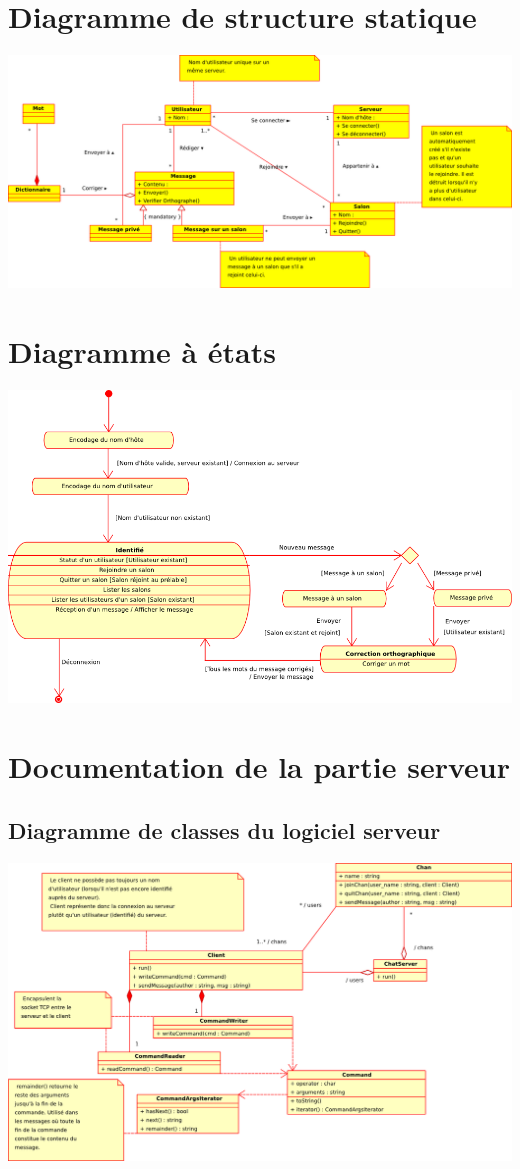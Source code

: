 \documentclass[a4paper]{article}
\begin{document}
\section{Diagramme de structure statique}

    \includegraphics[angle=90,width=0.9\linewidth]{structure_statique.png}

\section{Diagramme à états}

    \includegraphics[angle=90,width=0.9\linewidth]{state.png}

\section{Documentation de la partie serveur}

 \subsection{Diagramme de classes du logiciel serveur}

    \includegraphics[angle=90,width=0.9\linewidth]{class.png}
\end{document}
